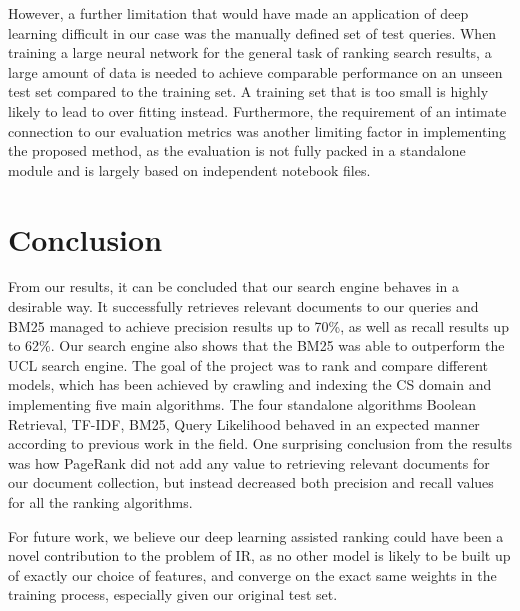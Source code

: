  However, a further limitation that would have made an application of deep learning difficult in our case was the manually defined set of test queries. When training a large neural network for the general task of ranking search results, a large amount of data is needed to achieve comparable performance on an unseen test set compared to the training set. A training set that is too small is highly likely to lead to over fitting instead. Furthermore, the requirement of an intimate connection to our evaluation metrics was another limiting factor in implementing the proposed method, as the evaluation is not fully packed in a standalone module and is largely based on independent notebook files.



\section{Conclusion} %
\label{sec:conclusion}

From our results, it can be concluded that our search engine behaves in a desirable way. It successfully retrieves relevant documents to our queries and BM25 managed to achieve precision results up to 70\%, as well as recall results up to 62\%. Our search engine also shows that the BM25 was able to outperform the UCL search engine. The goal of the project was to rank and compare different models, which has been achieved by crawling and indexing the CS domain and implementing five main algorithms. The four standalone algorithms Boolean Retrieval, TF-IDF, BM25, Query Likelihood behaved in an expected manner according to previous work in the field. One surprising conclusion from the results was how PageRank did not add any value to retrieving relevant documents for our document collection, but instead decreased both precision and recall values for all the ranking algorithms. 

For future work, we believe our deep learning assisted ranking could have been a novel contribution to the problem of IR, as no other model is likely to be built up of exactly our choice of features, and converge on the exact same weights in the training process, especially given our original test set.


